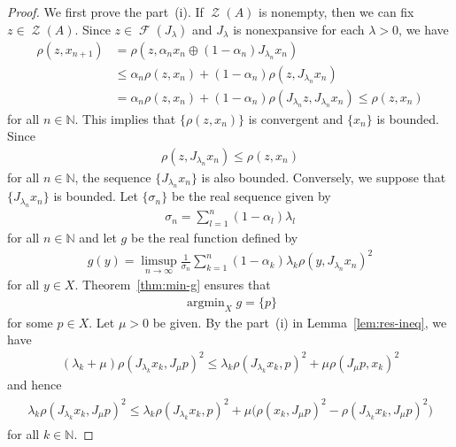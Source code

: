 \documentclass[draft]{amsart}
\numberwithin{equation}{section}
\def\N{\mathbb N}
\DeclareMathOperator*{\Argmin}{argmin}
\DeclareMathOperator{\Fix}{\mathcal{F}}
\DeclareMathOperator{\Zer}{\mathcal{Z}}
\theoremstyle{plain}
\theoremstyle{definition}
\theoremstyle{remark}
\begin{document}
\begin{proof}
 We first prove the part~(i). If $\Zer (A)$ is nonempty, then we can fix $z\in \Zer (A)$. 
 Since $z\in \Fix (J_{\lambda})$ and $J_{\lambda}$ is nonexpansive 
 for each $\lambda >0$, we have 
 \begin{align*}
  \rho(z, x_{n+1}) 
  & = \rho(z, \alpha_{n} x_n \oplus (1-\alpha_n) J_{\lambda_n}x_n) \\
  & \leq \alpha_n \rho(z, x_n) + (1-\alpha_n) \rho (z, J_{\lambda_n}x_n) \\
  & = \alpha_n \rho(z, x_n) + (1-\alpha_n) \rho (J_{\lambda_n}z, J_{\lambda_n}x_n)  \leq \rho (z, x_n)
 \end{align*}
 for all $n\in \N$. This implies that $\{\rho(z, x_n)\}$ is convergent and $\{x_n\}$ is bounded. 
 Since 
 \begin{align*}
  \rho (z, J_{\lambda_n}x_n) \leq \rho (z, x_n)
 \end{align*}
 for all $n\in \N$, the sequence $\{J_{\lambda_n}x_n\}$ is also bounded. 
 Conversely, we suppose that $\{J_{\lambda_n}x_n\}$ is bounded. 
 Let $\{\sigma_n\}$ be the real sequence given by 
 \begin{align*}
  \sigma_n = \sum_{l=1}^{n}(1-\alpha_l)\lambda_l 
 \end{align*}
 for all $n\in \N$ and let $g$ be the real function defined by 
 \begin{align*}
  g(y) = \limsup_{n\to \infty} \frac{1}{\sigma_n} 
  \sum_{k=1}^{n}(1-\alpha_k)\lambda_k \rho (y, J_{\lambda_n}x_n)^2
 \end{align*}
 for all $y\in X$. Theorem~\ref{thm:min-g} ensures that 
 \begin{align*}
  \Argmin_X g = \{p\}
 \end{align*}
 for some $p\in X$. Let $\mu>0$ be given. 
 By the part~(i) in Lemma~\ref{lem:res-ineq}, we have 
 \begin{align*}
  (\lambda_k + \mu) \rho (J_{\lambda_k}x_k, J_{\mu}p)^2 
  \leq \lambda_k \rho(J_{\lambda_k}x_k, p)^2 + \mu \rho(J_{\mu}p, x_k)^2
 \end{align*}
 and hence 
 \begin{align}
  \begin{split}\label{eq:thm:MPPA-CAT0-Delta-a}
  \lambda_k \rho(J_{\lambda_k}x_k, J_{\mu}p)^2 
  \leq \lambda_k \rho(J_{\lambda_k}x_k, p)^2 
  + \mu \bigl(
     \rho(x_k, J_{\mu}p)^2 - \rho (J_{\lambda_k}x_k, J_{\mu}p)^2 
   \bigr)
  \end{split}
 \end{align}
 for all $k\in \N$. 

\end{proof}
\end{document}
